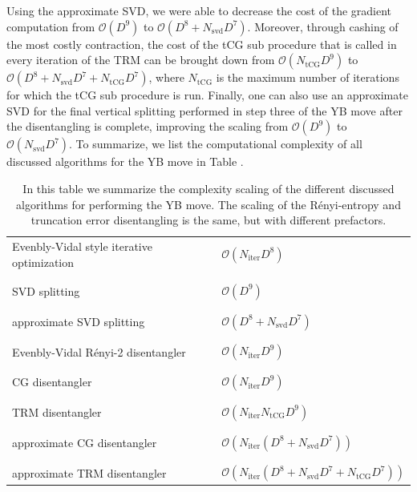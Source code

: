 Using the approximate SVD, we were able to decrease the cost of the gradient computation from $\mathcal{O}(D^9)$ to $\mathcal{O}(D^8 + N_\text{svd}D^7)$. Moreover, through cashing of the most costly contraction, the cost of the tCG sub procedure that is called in every iteration of the TRM can be brought down from $\mathcal{O}(N_\text{tCG}D^9)$ to $\mathcal{O}(D^8+N_\text{svd}D^7 + N_\text{tCG} D^7)$, where $N_\text{tCG}$ is the maximum number of iterations for which the tCG sub procedure is run. Finally, one can also use an approximate SVD for the final vertical splitting performed in step three of the YB move after the disentangling is complete, improving the scaling from $\mathcal{O}(D^9)$ to $\mathcal{O}(N_\text{svd}D^7)$. To summarize, we list the computational complexity of all discussed algorithms for the YB move in Table .
\begin{table}
	\begin{tabular}{ l | l }
		Evenbly-Vidal style iterative optimization & $\mathcal{O}(N_\text{iter}D^8)$ \\ \\[-1em]
		\hline \\[-1em]
		SVD splitting & $\mathcal{O}(D^9)$ \\ \\[-1em]
		\hline \\[-1em]
		approximate SVD splitting & $\mathcal{O}(D^8 + N_\text{svd}D^7)$ \\ \\[-1em]
		\hline
		\hline \\[-1em]
		Evenbly-Vidal Rényi-2 disentangler  & $\mathcal{O}(N_\text{iter}D^9)$ \\ \\[-1em]
		\hline \\[-1em]
		CG disentangler & $\mathcal{O}(N_\text{iter}D^9)$ \\ \\[-1em]
		\hline \\[-1em]
		TRM disentangler & $\mathcal{O}(N_\text{iter}N_\text{tCG}D^9)$ \\ \\[-1em]
		\hline \\[-1em]
		approximate CG disentangler & $\mathcal{O}(N_\text{iter}(D^8 + N_\text{svd}D^7))$ \\ \\[-1em]
		\hline \\[-1em]
		approximate TRM disentangler & $\mathcal{O}(N_\text{iter}(D^8 + N_\text{svd}D^7 + N_\text{tCG}D^7))$ \\
	\end{tabular}
	\caption{In this table we summarize the complexity scaling of the different discussed algorithms for performing the YB move. The scaling of the Rényi-entropy and truncation error disentangling is the same, but with different prefactors.}
	\label{table:computational_complexity_YB_move}
\end{table}
